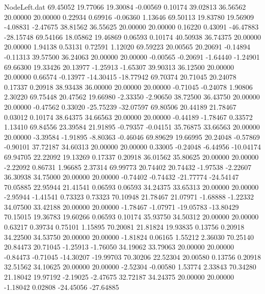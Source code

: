 \begin{filecontents}{NodeLeft.dat}
  69.45052   19.77066   19.30084    -0.00569    0.10174   39.02813   36.56562   20.00000   20.00000    0.22934    0.69916   -0.06360    1.13646
  69.50113   19.83780   19.56909    -4.08831   -2.47675   38.81562   36.55625   20.00000   20.00000    0.16220    0.43091  -46.47883  -28.15748
  69.54166   18.05862   19.46869     0.06593    0.10174   40.50938   36.74375   20.00000   20.00000    1.94138    0.53131    0.72591    1.12020
  69.59223   20.00565   20.20691    -0.14894   -0.11313   39.57500   36.24063   20.00000   20.00000   -0.00565   -0.20691   -1.64440   -1.24901
  69.66300   19.33426   20.13977    -1.25913   -1.65307   39.90313   36.12500   20.00000   20.00000    0.66574   -0.13977  -14.30415  -18.77942
  69.70374   20.71045   20.24078     0.17337    0.20918   38.93438   36.00000   20.00000   20.00000   -0.71045   -0.24078    1.90806    2.30220
  69.75448   20.47562   19.66980    -2.33350   -2.90650   38.72500   36.43750   20.00000   20.00000   -0.47562    0.33020  -25.75239  -32.07597
  69.80506   20.44189   21.78467     0.03012    0.10174   38.64375   34.66563   20.00000   20.00000   -0.44189   -1.78467    0.33572    1.13410
  69.84556   23.39584   21.91895    -0.79357   -0.04151   35.76875   33.66563   20.00000   20.00000   -3.39584   -1.91895   -8.80363   -0.46046
  69.89629   19.66995   20.24048    -0.57869   -0.90101   37.72187   34.60313   20.00000   20.00000    0.33005   -0.24048   -6.44956  -10.04174
  69.94705   22.22092   19.13269     0.17337    0.20918   36.01562   35.80625   20.00000   20.00000   -2.22092    0.86731    1.96685    2.37314
  69.99773   20.74402   20.74432    -1.97538   -2.22607   36.30938   34.75000   20.00000   20.00000   -0.74402   -0.74432  -21.77774  -24.54147
  70.05885   22.95944   21.41541     0.06593    0.06593   34.24375   33.65313   20.00000   20.00000   -2.95944   -1.41541    0.73323    0.73323
  70.10948   21.78467   21.07971    -1.68888   -1.22332   34.07500   33.42188   20.00000   20.00000   -1.78467   -1.07971  -19.05783  -13.80429
  70.15015   19.36783   19.60266     0.06593    0.10174   35.93750   34.50312   20.00000   20.00000    0.63217    0.39734    0.75101    1.15895
  70.20081   21.81824   19.93835     0.13756    0.20918   34.22500   34.53750   20.00000   20.00000   -1.81824    0.06165    1.55212    2.36030
  70.25140   20.84473   20.71045    -1.25913   -1.76050   34.19062   33.79063   20.00000   20.00000   -0.84473   -0.71045  -14.30207  -19.99703
  70.30206   22.52304   20.00580     0.13756    0.20918   32.51562   34.10625   20.00000   20.00000   -2.52304   -0.00580    1.53774    2.33843
  70.34280   21.18042   19.97192    -2.19025   -2.47675   32.72187   34.24375   20.00000   20.00000   -1.18042    0.02808  -24.45056  -27.64885

\end{filecontents}
